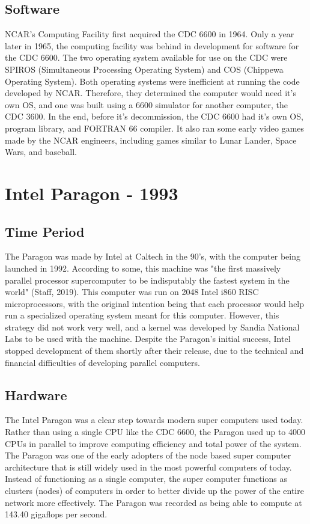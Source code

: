 \documentclass[letterpaper, 10 pt, conference]{IEEEconf}
\begin{document}
\subsection{Software}
NCAR's Computing Facility first acquired the CDC 6600 in 1964. 
Only a year later in 1965, the computing facility was behind in 
development for software for the CDC 6600. The two operating 
system available for use on the CDC were SPIROS (Simultaneous
Processing Operating System) and COS (Chippewa Operating System). 
Both operating systems were inefficient at running the code 
developed by NCAR. Therefore, they determined the computer would 
need it's own OS, and one was built using a 6600 simulator for 
another computer, the CDC 3600. In the end, before it's 
decommission, the CDC 6600 had it's own OS, program library, and 
FORTRAN 66 compiler. It also ran some early video games made by 
the NCAR engineers, including games similar to Lunar Lander, Space
Wars, and baseball.
\section{Intel Paragon - 1993}
\subsection{Time Period}
The Paragon was made by Intel at Caltech in the 90's, with the computer being launched in 1992. According to some, this machine was "the first massively parallel processor supercomputer to be indisputably the fastest system in the world" (Staff, 2019). This computer was run on 2048 Intel i860 RISC microprocessors, with the original intention being that each processor would help run a specialized operating system meant for this computer. However, this strategy did not work very well, and a kernel was developed by Sandia National Labs to be used with the machine. Despite the Paragon's initial success, Intel stopped development of them shortly after their release, due to the technical and financial difficulties of developing parallel computers.
\subsection{Hardware}
The Intel Paragon was a clear step towards modern super computers used today. Rather than using a single CPU like the CDC 6600, the Paragon used up to 4000 CPUs in parallel to improve computing efficiency and total power of the system. The Paragon was one of the early adopters of the node based super computer architecture that is still widely used in the most powerful computers of today. Instead of functioning as a single computer, the super computer functions as clusters (nodes) of computers in order to better divide up the power of the entire network more effectively. The Paragon was recorded as being able to compute at 143.40 gigaflops per second. 
\end{document}
